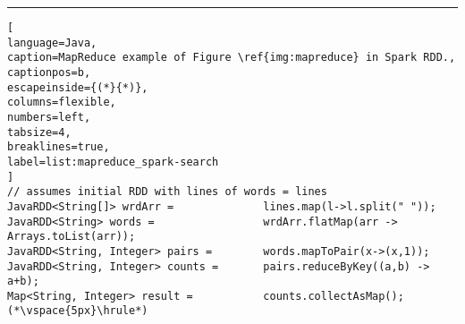 \begin{small}
\vspace{8px}\hrule
\begin{lstlisting}[
language=Java,
caption=MapReduce example of Figure \ref{img:mapreduce} in Spark RDD.,
captionpos=b, 
escapeinside={(*}{*)}, 
columns=flexible,
numbers=left,
tabsize=4,
breaklines=true,
label=list:mapreduce_spark-search
]
// assumes initial RDD with lines of words = lines
JavaRDD<String[]> wrdArr = 				lines.map(l->l.split(" "));
JavaRDD<String> words =					wrdArr.flatMap(arr -> Arrays.toList(arr));
JavaRDD<String, Integer> pairs =		words.mapToPair(x->(x,1));
JavaRDD<String, Integer> counts = 		pairs.reduceByKey((a,b) -> a+b);
Map<String, Integer> result =			counts.collectAsMap();(*\vspace{5px}\hrule*)
\end{lstlisting}
\end{small}